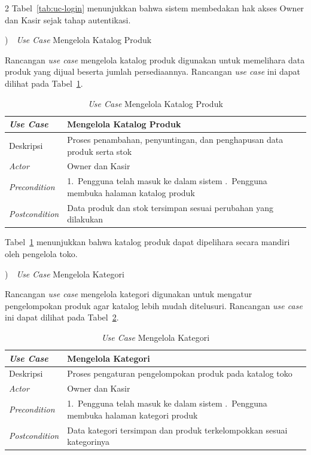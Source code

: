 \documentclass[12pt, a4paper, onecolumn, oneside]{report}
\begin{document}
\begin{spacing}{2}
Tabel~\ref{tab:uc-login} menunjukkan bahwa sistem membedakan hak akses Owner dan Kasir sejak tahap autentikasi.

)~~\textit{Use Case} Mengelola Katalog Produk

Rancangan \textit{use case} mengelola katalog produk digunakan untuk memelihara data produk yang dijual beserta jumlah persediaannya. Rancangan \textit{use case} ini dapat dilihat pada Tabel~\ref{tab:uc-produk}.

\begin{table}[H]
\centering
\caption{\textit{Use Case} Mengelola Katalog Produk}
\label{tab:uc-produk}
\begin{tabularx}{\textwidth}{|p{3.2cm}|X|}
\hline
\textbf{\textit{Use Case}} & \textbf{Mengelola Katalog Produk} \\ \hline
Deskripsi & Proses penambahan, penyuntingan, dan penghapusan data produk serta stok \\ \hline
\textit{Actor} & Owner dan Kasir \\ \hline
\textit{Precondition} & 1.~Pengguna telah masuk ke dalam sistem \newline 2.~Pengguna membuka halaman katalog produk \\ \hline
\textit{Postcondition} & Data produk dan stok tersimpan sesuai perubahan yang dilakukan \\ \hline
\end{tabularx}
\end{table}

Tabel~\ref{tab:uc-produk} menunjukkan bahwa katalog produk dapat dipelihara secara mandiri oleh pengelola toko.

)~~\textit{Use Case} Mengelola Kategori

Rancangan \textit{use case} mengelola kategori digunakan untuk mengatur pengelompokan produk agar katalog lebih mudah ditelusuri. Rancangan \textit{use case} ini dapat dilihat pada Tabel~\ref{tab:uc-kategori}.

\begin{table}[H]
\centering
\caption{\textit{Use Case} Mengelola Kategori}
\label{tab:uc-kategori}
\begin{tabularx}{\textwidth}{|p{3.2cm}|X|}
\hline
\textbf{\textit{Use Case}} & \textbf{Mengelola Kategori} \\ \hline
Deskripsi & Proses pengaturan pengelompokan produk pada katalog toko \\ \hline
\textit{Actor} & Owner dan Kasir \\ \hline
\textit{Precondition} & 1.~Pengguna telah masuk ke dalam sistem \newline 2.~Pengguna membuka halaman kategori produk \\ \hline
\textit{Postcondition} & Data kategori tersimpan dan produk terkelompokkan sesuai kategorinya \\ \hline
\end{tabularx}
\end{table}


\end{spacing}
\end{document}
